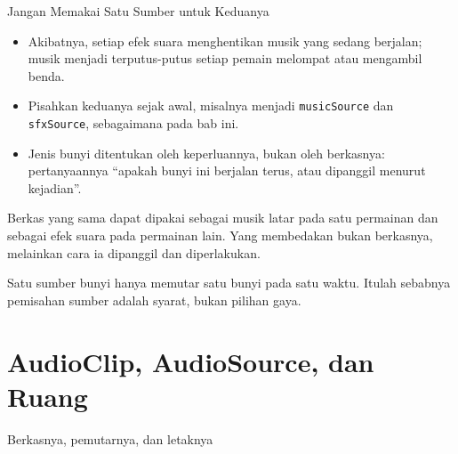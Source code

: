 \documentclass[aspectratio=169,10pt]{beamer}
\begin{document}
\begin{frame}{Jangan Memakai Satu Sumber untuk Keduanya}
\begin{itemize}
  \item Akibatnya, setiap efek suara menghentikan musik yang sedang berjalan;
        musik menjadi terputus-putus setiap pemain melompat atau mengambil
        benda.
  \item Pisahkan keduanya sejak awal, misalnya menjadi \texttt{musicSource}
        dan \texttt{sfxSource}, sebagaimana pada bab ini.
  \item Jenis bunyi ditentukan oleh keperluannya, bukan oleh berkasnya:
        pertanyaannya ``apakah bunyi ini berjalan terus, atau dipanggil menurut
        kejadian''.
\end{itemize}
\vspace{0.18cm}
\begin{peringatan}
Berkas yang sama dapat dipakai sebagai musik latar pada satu permainan dan
sebagai efek suara pada permainan lain. Yang membedakan bukan berkasnya,
melainkan cara ia dipanggil dan diperlakukan.
\end{peringatan}
\begin{kotak}
Satu sumber bunyi hanya memutar satu bunyi pada satu waktu. Itulah sebabnya
pemisahan sumber adalah syarat, bukan pilihan gaya.
\end{kotak}
\end{frame}

\section{AudioClip, AudioSource, dan Ruang}
  {Berkasnya, pemutarnya, dan letaknya}
\end{document}
